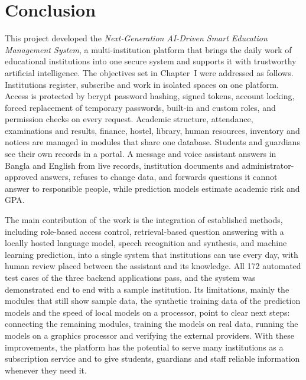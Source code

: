 \section{Conclusion}
This project developed the \textit{Next-Generation AI-Driven Smart Education Management System}, a multi-institution platform that brings the daily work of educational institutions into one secure system and supports it with trustworthy artificial intelligence. The objectives set in Chapter~I were addressed as follows. Institutions register, subscribe and work in isolated spaces on one platform. Access is protected by bcrypt password hashing, signed tokens, account locking, forced replacement of temporary passwords, built-in and custom roles, and permission checks on every request. Academic structure, attendance, examinations and results, finance, hostel, library, human resources, inventory and notices are managed in modules that share one database. Students and guardians see their own records in a portal. A message and voice assistant answers in Bangla and English from live records, institution documents and administrator-approved answers, refuses to change data, and forwards questions it cannot answer to responsible people, while prediction models estimate academic risk and GPA.

The main contribution of the work is the integration of established methods, including role-based access control, retrieval-based question answering with a locally hosted language model, speech recognition and synthesis, and machine learning prediction, into a single system that institutions can use every day, with human review placed between the assistant and its knowledge. All 172 automated test cases of the three backend applications pass, and the system was demonstrated end to end with a sample institution. Its limitations, mainly the modules that still show sample data, the synthetic training data of the prediction models and the speed of local models on a processor, point to clear next steps: connecting the remaining modules, training the models on real data, running the models on a graphics processor and verifying the external providers. With these improvements, the platform has the potential to serve many institutions as a subscription service and to give students, guardians and staff reliable information whenever they need it.
